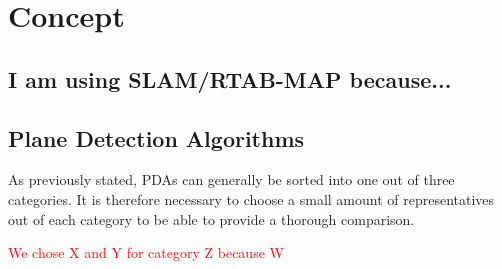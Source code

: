 \documentclass[main.tex]{subfiles}
\begin{document}
\chapter{Concept} \label{chap:Concept}


\section{I am using SLAM/RTAB-MAP because...}
\section{Plane Detection Algorithms}
As previously stated, PDAs can generally be sorted into one out of three categories. It is therefore necessary to choose a small amount of representatives out of each category to be able to provide a thorough comparison.

\textcolor{red}{We chose X and Y for category Z because W}
\end{document}
